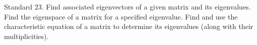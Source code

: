 Standard 23.	Find associated eigenvectors of a given matrix and its eigenvalues. Find the eigenspace of a matrix for a specified eigenvalue. Find and use the characteristic equation of a matrix to determine its eigenvalues (along with their multiplicities).


\ifprintanswers
\else %
 \newpage
\fi

\begin{solution}
    
\end{solution}